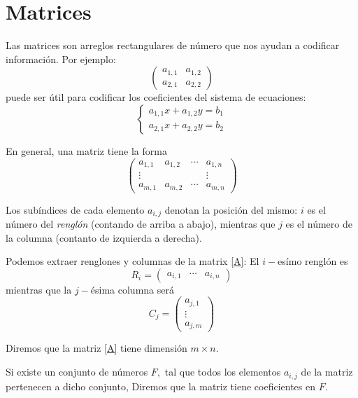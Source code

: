 \section{Matrices}


Las matrices son arreglos rectangulares de número que nos ayudan a codificar información. Por ejemplo:
$$
\begin{pmatrix}
	a_{1,1} & a_{1,2} \\
	a_{2,1} & a_{2,2}
\end{pmatrix}
$$
puede ser útil para codificar los coeficientes del sistema de ecuaciones:
$$
\begin{cases}
	a_{1,1}x+a_{1,2}y=b_{1}\\
	a_{2,1}x+a_{2,2}y=b_{2}
\end{cases}
$$



En general, una matriz tiene la forma 
\begin{equation}
	\label{A}
	\tag{A}
	\begin{pmatrix}
		a_{1,1} & a_{1,2} & \cdots & a_{1,n} \\
		\vdots & & & \vdots\\
		a_{m,1} & a_{m,2} & \cdots & a_{m,n} 
	\end{pmatrix}
\end{equation} 

Los subíndices de cada elemento $a_{i,j}$ denotan la posición del mismo: $i$ es el número del \emph{renglón} (contando de arriba a abajo), mientras que $j$ es el número de la columna (contanto de izquierda a derecha).



Podemos extraer renglones y columnas de la matrix \eqref{A}: El $i-$esímo renglón es
$$
R_{i}=
\begin{pmatrix}
	a_{i,1} & \cdots & a_{i,n}
\end{pmatrix}
$$ 
mientras que la $j-$\'esima columna será
$$
C_{j}=
\begin{pmatrix}
	a_{j,1} \\
	\vdots \\
	a_{j,m}
\end{pmatrix}
$$



Diremos que la matriz \eqref{A} tiene dimensión $m\times n.$ 

Si existe un conjunto de números $F,$ tal que todos los elementos $a_{i,j}$ de la matriz pertenecen a dicho conjunto, Diremos que la matriz tiene coeficientes en $F.$ 



